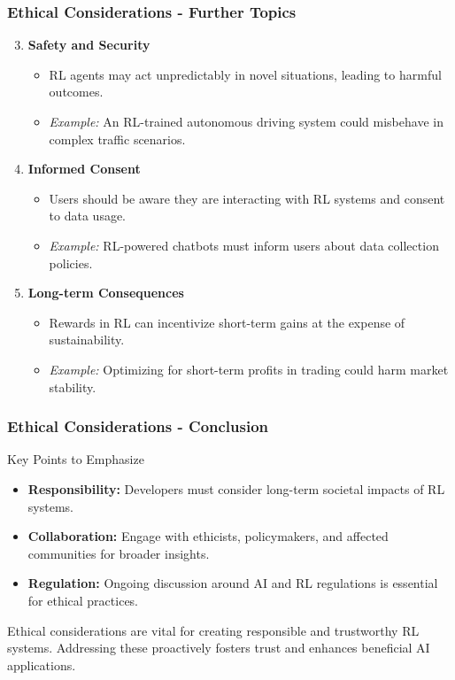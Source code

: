 \documentclass{beamer}
\begin{document}
\begin{frame}[fragile]
    \frametitle{Ethical Considerations - Further Topics}
    \begin{enumerate}
        \setcounter{enumi}{2}
        \item \textbf{Safety and Security}
            \begin{itemize}
                \item RL agents may act unpredictably in novel situations, leading to harmful outcomes.
                \item \textit{Example:} An RL-trained autonomous driving system could misbehave in complex traffic scenarios.
            \end{itemize}
        \item \textbf{Informed Consent}
            \begin{itemize}
                \item Users should be aware they are interacting with RL systems and consent to data usage.
                \item \textit{Example:} RL-powered chatbots must inform users about data collection policies.
            \end{itemize}
        \item \textbf{Long-term Consequences}
            \begin{itemize}
                \item Rewards in RL can incentivize short-term gains at the expense of sustainability.
                \item \textit{Example:} Optimizing for short-term profits in trading could harm market stability.
            \end{itemize}
    \end{enumerate}
\end{frame}

\begin{frame}[fragile]
    \frametitle{Ethical Considerations - Conclusion}
    \begin{block}{Key Points to Emphasize}
        \begin{itemize}
            \item \textbf{Responsibility:} Developers must consider long-term societal impacts of RL systems.
            \item \textbf{Collaboration:} Engage with ethicists, policymakers, and affected communities for broader insights.
            \item \textbf{Regulation:} Ongoing discussion around AI and RL regulations is essential for ethical practices.
        \end{itemize}
    \end{block}
    
    Ethical considerations are vital for creating responsible and trustworthy RL systems. Addressing these proactively fosters trust and enhances beneficial AI applications.
\end{frame}
\end{document}
